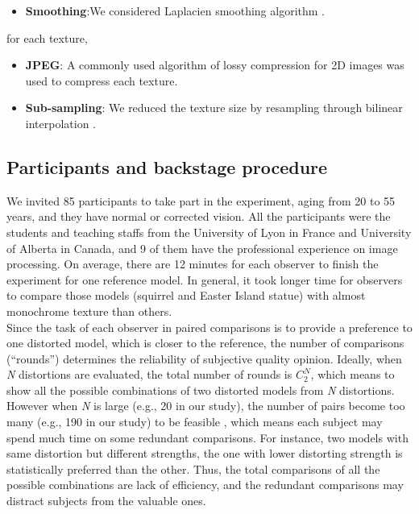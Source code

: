 \begin{itemize}
\item \textbf{Smoothing}:We considered Laplacien smoothing algorithm \cite{Steinbrecher_2008}.
\end{itemize}
for each texture,
\begin{itemize}
\item \textbf{JPEG}: A commonly used algorithm of lossy compression for 2D images was used to compress each texture.
\end{itemize}
\begin{itemize}
\item \textbf{Sub-sampling}: We reduced the texture size by resampling through bilinear interpolation .
\end{itemize}
\subsection{Participants and backstage procedure}
We invited 85 participants to take part in the experiment, aging from 20 to 55 years, and they have normal or corrected vision. All the participants were the students and teaching staffs from the University of Lyon in France and University of Alberta in Canada, and 9 of them have the professional experience on image processing. On average, there are 12 minutes for each observer to finish the experiment for one reference model.  In general, it took longer time for observers to compare those models (squirrel and Easter Island statue) with almost monochrome texture than others.\\
Since the task of each observer in paired comparisons is to provide a preference to one distorted model, which is closer to the reference, the number of comparisons (“rounds”) determines the reliability of subjective quality opinion. Ideally, when \textit{N} distortions are evaluated, the total number of rounds is $C^N_2$, which means to show all the possible combinations of two distorted models from \textit{N} distortions. However when \textit{N} is large (e.g., 20 in our study), the number of pairs become too many (e.g., 190 in our study) to be feasible \cite{Lee_2011}, which means each subject may spend much time on some redundant comparisons. For instance, two models with same distortion but different strengths, the one with lower distorting strength is statistically preferred than the other. Thus, the total comparisons of all the possible combinations are lack of efficiency, and the redundant comparisons may distract subjects from the valuable ones.\\
